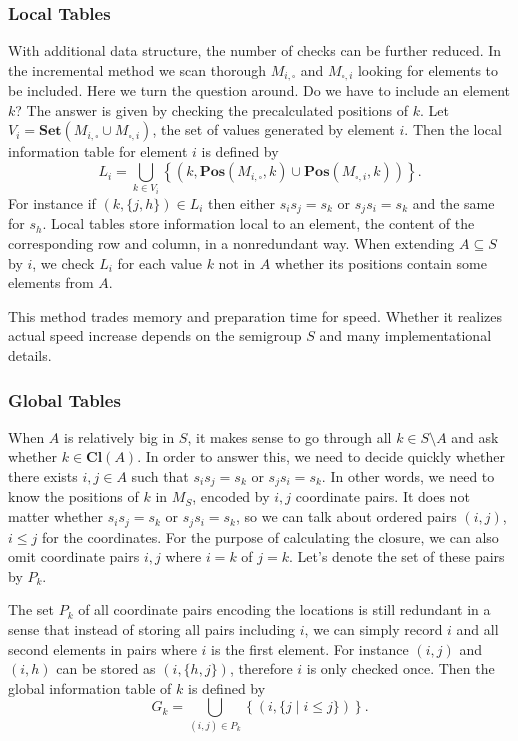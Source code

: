 \documentclass{amsart}
\newcommand{\Set}{\mathbf{Set}}
\newcommand{\Closure}{\mathbf{Cl}}
\newcommand{\Pos}{\mathbf{Pos}}
\theoremstyle{plain}
\theoremstyle{definition}
\begin{document}
\subsubsection{Local Tables}
With additional data structure, the number of checks can be further reduced. 
In the incremental method we scan thorough $M_{i,\square}$ and $M_{\square,i}$ looking for elements to be included.
Here we turn the question around.
Do we have to include an element $k$?
The answer is given by checking the precalculated positions of $k$. 
Let $V_i=\Set(M_{i,\square}\cup M_{\square,i})$, the set of values generated by element $i$.
Then the  local information table for element $i$ is defined by
$$L_i=\bigcup_{k\in V_i}\left\{(k,\Pos(M_{i,\square},k)\cup\Pos(M_{\square,i},k))\right\}.$$
For instance if $(k,\{j,h\})\in L_i$ then either $s_is_j=s_k$ or $s_js_i=s_k$ and the same for $s_h$.
Local tables store information local to an element, the content of the corresponding row and column, in a nonredundant way.
When  extending $A\subseteq S$ by $i$, we check $L_i$ for each value $k$ not in $A$ whether its positions contain some elements from $A$. 

This method trades memory and preparation time for speed. Whether it realizes actual speed increase depends on the semigroup $S$ and many implementational details.

\subsubsection{Global Tables}
When $A$ is relatively big in $S$, it makes sense to go through all $k\in S\setminus A$ and ask whether $k\in\Closure(A)$. 
In order to answer this, we need to decide quickly whether there exists $i,j\in A$ such that $s_is_j=s_k$ or $s_js_i=s_k$.
In other words, we need to know the positions of $k$ in $M_S$, encoded by $i,j$ coordinate pairs.
It does not matter whether $s_is_j=s_k$ or $s_js_i=s_k$, so we can talk about ordered pairs $(i,j)$, $i\leq j$ for the coordinates. 
For the purpose of calculating the closure, we can also omit coordinate pairs $i,j$ where $i=k$ of $j=k$. 
Let's denote the set of these pairs by $P_k$.

The set $P_k$ of all coordinate pairs encoding the locations is still redundant in a sense that instead of storing all pairs including $i$, we can simply record $i$ and all second  elements in  pairs where $i$ is the first element.
For instance $(i,j)$ and $(i,h)$ can be stored as $(i,\{h,j\})$, therefore $i$ is only checked once.
Then the  global information table of $k$ is defined by
$$G_k=\bigcup_{(i,j)\in P_k} \left\{ (i,\{j\mid i\leq j\})\right\}.$$
\end{document}
